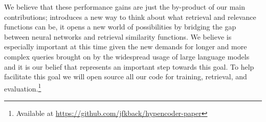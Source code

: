 \documentclass[sigconf,]{acmart}
\begin{document}
We believe that these performance gains are just the by-product of our main contributions; \name{} introduces a new way to think about what retrieval and relevance functions can be, it opens a new world of possibilities by bridging the gap between neural networks and retrieval similarity functions. We believe \name{} is especially important at this time given the new demands for longer and more complex queries brought on by the widespread usage of large language models and it is our belief that \name{} represents an important step towards this goal. To help facilitate this goal we will open source all our code for training, retrieval, and evaluation.\footnote{Available at \url{https://github.com/jfkback/hypencoder-paper}}


\end{document}
